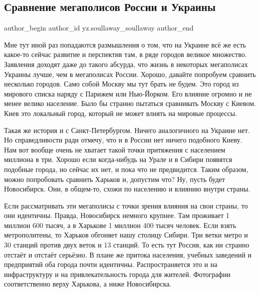  
 
 
 
 
 
\subsection{Сравнение мегаполисов России и Украины}
\label{sec:28_11_2021.yz.soullaway_soullaway.1.megapolisy_sravnenie}
 
\ifcmt
 author_begin
   author_id yz.soullaway_soullaway
 author_end
\fi

Мне тут иной раз попадаются размышления о том, что на Украине всё же есть
какое-то сейчас развитие и перспектив там, в ряде городов великое множество.
Заявления доходят даже до такого абсурда, что жизнь в некоторых мегаполисах
Украины лучше, чем в мегаполисах России. Хорошо, давайте попробуем сравнить
несколько городов. Само собой Москву мы тут брать не будем. Это город из
мирового списка наряду с Парижем или Нью-Йорком. Его влияние огромно и не менее
велико население. Было бы странно пытаться сравнивать Москву с Киевом. Киев это
локальный город, который не может влиять на мировые процессы.


Такая же история и с Санкт-Петербургом. Ничего аналогичного на Украине нет. Но
справедливости ради отмечу, что и в России нет ничего подобного Киеву. Нам вот
вообще очень не хватает такой точки притяжения с населением миллиона в три.
Хорошо если когда-нибудь на Урале и в Сибири появятся подобные города, но
сейчас их нет, и пока что не предвидится. Таким образом, можно попробовать
сравнить Харьков и, допустим что? Ну, пусть будет Новосибирск. Они, в общем-то,
схожи по населению и влиянию внутри страны.

Если рассматривать эти мегаполисы с точки зрения влияния на свои страны, то они
идентичны. Правда, Новосибирск немного крупнее. Там проживает 1 миллион 600
тысяч, а в Харькове 1 миллион 400 тысяч человек. Если взять метрополитены, то
Харьков обгоняет нашу столицу Сибири. Три ветки метро и 30 станций против двух
веток и 13 станций. То есть тут Россия, как ни странно отстаёт и отстаёт
серьёзно. В плане же притока населения, учебных заведений и предприятий оба
города почти идентичны. Распространяется это и на инфраструктуру и на
привлекательность города для жителей. Фотографии соответственно верху Харькова,
а ниже Новосибирска.

